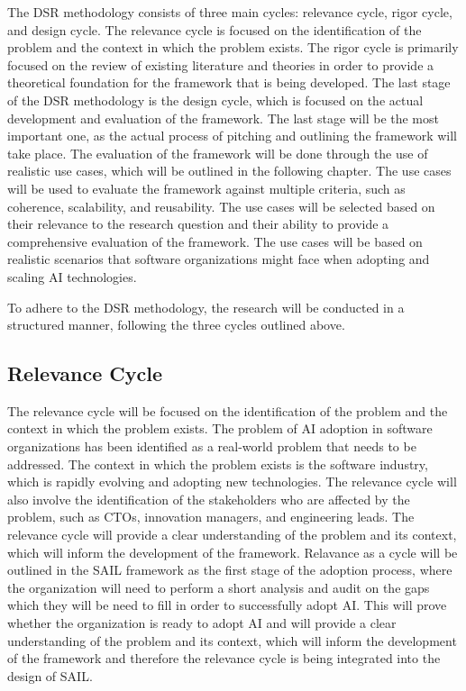 \documentclass[]{imc-inf}
\begin{document}
The DSR methodology consists of three main cycles: relevance cycle,
rigor cycle, and design cycle. The relevance cycle is focused on the
identification of the problem and the context in which the problem
exists. The rigor cycle is primarily focused on the review of existing
literature and theories in order to provide a theoretical foundation for
the framework that is being developed. The last stage of the DSR
methodology is the design cycle, which is focused on the actual
development and evaluation of the framework. The last stage will be the
most important one, as the actual process of pitching and outlining the
framework will take place. The evaluation of the framework will be done
through the use of realistic use cases, which will be outlined in the
following chapter. The use cases will be used to evaluate the framework
against multiple criteria, such as coherence, scalability, and
reusability. The use cases will be selected based on their relevance to
the research question and their ability to provide a comprehensive
evaluation of the framework. The use cases will be based on realistic
scenarios that software organizations might face when adopting and
scaling AI technologies.

To adhere to the DSR methodology, the research will be conducted in a
structured manner, following the three cycles outlined above.

\subsection{Relevance Cycle}\label{relevance-cycle}

The relevance cycle will be focused on the identification of the problem
and the context in which the problem exists. The problem of AI adoption
in software organizations has been identified as a real-world problem
that needs to be addressed. The context in which the problem exists is
the software industry, which is rapidly evolving and adopting new
technologies. The relevance cycle will also involve the identification
of the stakeholders who are affected by the problem, such as CTOs,
innovation managers, and engineering leads. The relevance cycle will
provide a clear understanding of the problem and its context, which will
inform the development of the framework. Relavance as a cycle will be
outlined in the SAIL framework as the first stage of the adoption
process, where the organization will need to perform a short analysis
and audit on the gaps which they will be need to fill in order to
successfully adopt AI. This will prove whether the organization is ready
to adopt AI and will provide a clear understanding of the problem and
its context, which will inform the development of the framework and
therefore the relevance cycle is being integrated into the design of
SAIL.
\end{document}
